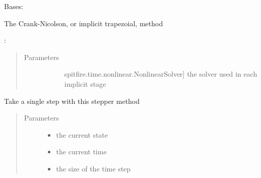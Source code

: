 \documentclass[letterpaper,10pt,english]{sphinxmanual}
\begin{document}
\begin{fulllineitems}
\label{\detokenize{spitfire.time.methods:spitfire.time.methods.CrankNicolson}}
Bases: {\hyperref[\detokenize{spitfire.time.methods:spitfire.time.methods.ImplicitTimeStepper}]{}}

The Crank-Nicolson, or implicit trapezoial, method

:
\begin{quote}\begin{description}
\item[{Parameters}] \leavevmode\begin{description}
\item[{}] \leavevmode{[}spitfire.time.nonlinear.NonlinearSolver{]}
the solver used in each implicit stage

\end{description}

\end{description}\end{quote}

\begin{fulllineitems}
\label{\detokenize{spitfire.time.methods:spitfire.time.methods.CrankNicolson.single_step}}
Take a single step with this stepper method
\begin{quote}\begin{description}
\item[{Parameters}] \leavevmode\begin{itemize}
\item {} 
 \textendash{} the current state

\item {} 
 \textendash{} the current time

\item {} 
 \textendash{} the size of the time step


\end{itemize}
\end{description}
\end{quote}
\end{fulllineitems}
\end{fulllineitems}
\end{document}
